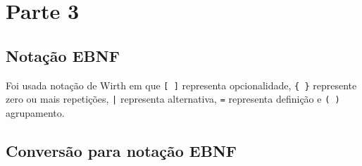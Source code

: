 \section{Parte 3}

\subsection{Notação EBNF}

Foi usada notação de Wirth em que \texttt{[ ]} representa opcionalidade, \texttt{\{ \}} represente zero ou mais repetições, \texttt{|} representa alternativa, \texttt{=} representa definição e \texttt{( )} agrupamento.

\subsection{Conversão para notação EBNF}


